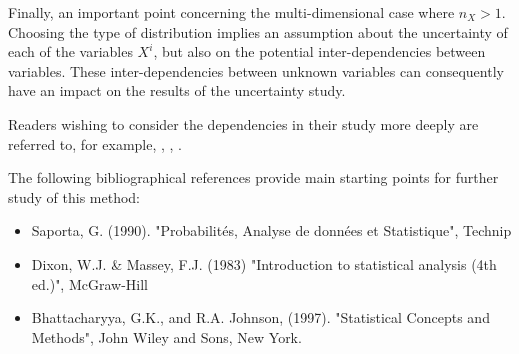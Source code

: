 {Finally, an important point concerning the multi-dimensional case where $n_X > 1$. Choosing the type of distribution implies an assumption about the uncertainty of each of the variables $X^i$, but also on the potential inter-dependencies between variables. These inter-dependencies between unknown variables can consequently have an impact on the results of the uncertainty study.

Readers wishing to consider the dependencies in their study more deeply are referred to, for example, , , . \vspace{2mm}

The following bibliographical references provide main starting points for further study of this method:
\begin{itemize}
\item Saporta, G. (1990). "Probabilités, Analyse de données et Statistique", Technip
\item Dixon, W.J. \& Massey, F.J. (1983) "Introduction to statistical analysis (4th ed.)", McGraw-Hill
\item Bhattacharyya, G.K., and R.A. Johnson, (1997). "Statistical Concepts and Methods", John Wiley and Sons, New York.
\end{itemize}
}
